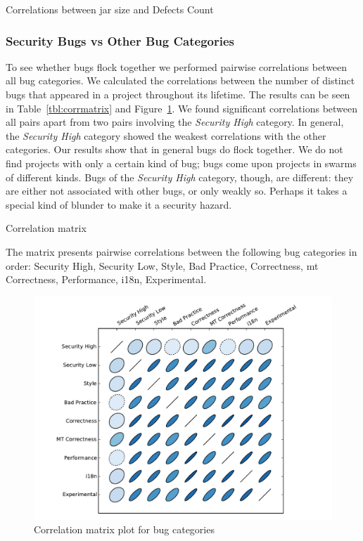 \documentclass[conference]{llncs}
\begin{document}
\begin{table}
    \centering
    \caption{Correlations between jar size and Defects Count}
    \label{tbl:jarsizecorr}
    
\end{table}

\subsubsection{Security Bugs {\sc vs} Other Bug Categories}

To see whether bugs flock together we performed pairwise correlations
between all bug categories. We calculated the correlations between the
number of distinct bugs that appeared in a project throughout its
lifetime. The results can be seen in Table~\ref{tbl:corrmatrix} and
Figure~\ref{fig:corrplot}. We found significant correlations between
all pairs apart from two pairs involving the {\it Security High}
category. In general, the {\it Security High} category showed the
weakest correlations with the other categories. Our results show that
in general bugs do flock together. We do not find projects with only a
certain kind of bug; bugs come upon projects in swarms of different
kinds. Bugs of the {\it Security High} category, though, are
different: they are either not associated with other bugs, or only
weakly so. Perhaps it takes a special kind of blunder to make it a
security hazard.

\begin{table}
    \centering
    \caption{Correlation matrix}
    \label{tbl:corrmatrix}
    
    \small The matrix presents pairwise correlations between the
        following bug categories in order: Security High, Security
        Low, Style, Bad Practice, Correctness, {\sc mt} Correctness,
        Performance, i18n, Experimental.
\end{table}


\begin{figure}
  \centering
  \includegraphics[scale=0.6]{corrplot.pdf}
  \caption{Correlation matrix plot for bug categories}
  \label{fig:corrplot}
\end{figure}
\end{document}
